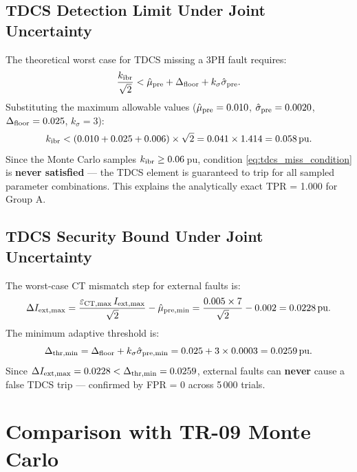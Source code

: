 \documentclass[11pt,a4paper]{article}
\begin{document}
\subsection{TDCS Detection Limit Under Joint Uncertainty}

The theoretical worst case for TDCS missing a 3PH fault requires:
\begin{equation}
  \frac{k_{\rm ibr}}{\sqrt{2}} < \hat{\mu}_{\rm pre} + \Delta_{\rm floor}
    + k_{\sigma}\hat{\sigma}_{\rm pre}.
  \label{eq:tdcs_miss_condition}
\end{equation}
Substituting the maximum allowable values
($\hat{\mu}_{\rm pre} = 0.010$, $\hat{\sigma}_{\rm pre} = 0.0020$,
$\Delta_{\rm floor} = 0.025$, $k_{\sigma} = 3$):
\begin{equation}
  k_{\rm ibr} < (0.010 + 0.025 + 0.006)\times\sqrt{2} = 0.041\times 1.414
              = 0.058\,\text{pu}.
  \label{eq:tdcs_miss_kibr}
\end{equation}
Since the Monte Carlo samples $k_{\rm ibr} \geq 0.06$\,pu, condition
\eqref{eq:tdcs_miss_condition} is \textbf{never satisfied} — the TDCS
element is guaranteed to trip for all sampled parameter combinations.
This explains the analytically exact TPR = 1.000 for Group A.

\subsection{TDCS Security Bound Under Joint Uncertainty}

The worst-case CT mismatch step for external faults is:
\begin{equation}
  \Delta I_{\rm ext,max} = \frac{\varepsilon_{\rm CT,max}\,I_{\rm ext,max}}{\sqrt{2}}
    - \hat{\mu}_{\rm pre,min}
  = \frac{0.005\times 7}{\sqrt{2}} - 0.002 = 0.0228\,\text{pu}.
  \label{eq:ext_max}
\end{equation}
The minimum adaptive threshold is:
\begin{equation}
  \Delta_{\rm thr,min} = \Delta_{\rm floor} + k_{\sigma}\hat{\sigma}_{\rm pre,min}
  = 0.025 + 3\times 0.0003 = 0.0259\,\text{pu}.
  \label{eq:thr_min}
\end{equation}
Since $\Delta I_{\rm ext,max} = 0.0228 < \Delta_{\rm thr,min} = 0.0259$,
external faults can \textbf{never} cause a false TDCS trip — confirmed by
FPR = 0 across 5\,000 trials.

\section{Comparison with TR-09 Monte Carlo}
\end{document}
